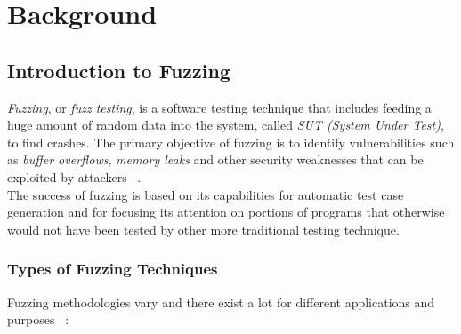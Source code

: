 \chapter{Background}
\label{chap:background}

\section{Introduction to Fuzzing}

\textit{Fuzzing}, or \textit{fuzz testing}, is a software testing technique that includes feeding a huge amount of random data into the system, called \textit{SUT (System Under Test)}, to find crashes. The primary objective of fuzzing is to identify vulnerabilities such as \textit{buffer overflows}, \textit{memory leaks} and other security weaknesses that can be exploited by attackers ~\cite{fuzzingprogresschallenges}.
\\The success of fuzzing is based on its capabilities for automatic test case generation and for focusing its attention on portions of programs that otherwise would not have been tested by other more traditional testing technique.

\subsection{Types of Fuzzing Techniques}
Fuzzing methodologies vary and there exist a lot for different applications and purposes ~\cite{statefulfuzzingcristian}:

